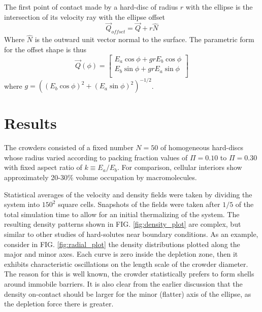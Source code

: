 The first point of contact made by a hard-disc of radius $r$ with the ellipse is the intersection of its velocity ray with the ellipse offset
%
\begin{equation}
\vec Q_{\textit{offset}} = \vec Q + r\hat N
\end{equation}
%
Where $\hat N$ is the outward unit vector normal to the surface. The parametric form for the offset shape is thus
%
\begin{equation}
\vec Q(\phi) = \begin{bmatrix}
	E_a \cos \phi  + g r E_b \cos \phi\\
	E_b \sin \phi  + g r E_a \sin \phi\\
\end{bmatrix} \end{equation}
%
where $g={((E_b \cos \phi)^2 + (E_a \sin \phi)^2)}^{-1/2}$.

\section{Results}

The crowders consisted of a fixed number $N=50$ of homogeneous hard-discs whose radius varied according to packing fraction values of $\Pi=0.10$ to $\Pi=0.30$ with fixed aspect ratio of $k \equiv E_a/E_b$. For comparison, cellular interiors show approximately 20-30\% volume occupation by macromolecules.\cite{ellis_macromolecular_2001} 

Statistical averages of the velocity and density fields were taken by dividing the system into $150^2$ square cells. Snapshots of the fields were taken after $1/5$ of the total simulation time to allow for an initial thermalizing of the system. The resulting density patterns shown in FIG. \ref{fig:density_plot} are complex, but similar to other studies of hard-solutes near boundary conditions. As an example, consider in FIG. \ref{fig:radial_plot} the density distributions plotted along the major and minor axes. Each curve is zero inside the depletion zone, then it exhibits characteristic oscillations on the length scale of the crowder diameter. The reason for this is well known, the crowder statistically prefers to form shells around immobile barriers. It is also clear from the earlier discussion that the density on-contact should be larger for the minor (flatter) axis of the ellipse, as the depletion force there is greater.

